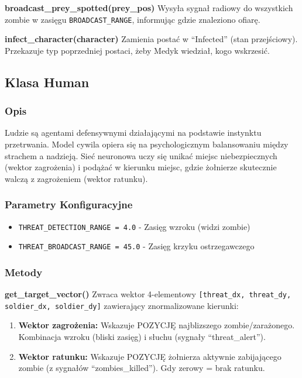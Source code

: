 \documentclass[12pt,a4paper]{article}
\begin{document}
\textbf{broadcast\_prey\_spotted(prey\_pos)}
Wysyła sygnał radiowy do wszystkich zombie w zasięgu \texttt{BROADCAST\_RANGE}, informując gdzie znaleziono ofiarę.

\textbf{infect\_character(character)}
Zamienia postać w ``Infected'' (stan przejściowy). Przekazuje typ poprzedniej postaci, żeby Medyk wiedział, kogo wskrzesić.

\subsection{Klasa Human}

\subsubsection{Opis}
Ludzie są agentami defensywnymi działającymi na podstawie instynktu
przetrwania. Model cywila opiera się na psychologicznym balansowaniu między
strachem a nadzieją. Sieć neuronowa uczy się unikać miejsc niebezpiecznych
(wektor zagrożenia) i podążać w kierunku miejsc, gdzie żołnierze skutecznie
walczą z zagrożeniem (wektor ratunku).

\subsubsection{Parametry Konfiguracyjne}
\begin{itemize}
	\item \texttt{THREAT\_DETECTION\_RANGE = 4.0} - Zasięg wzroku (widzi zombie)
	\item \texttt{THREAT\_BROADCAST\_RANGE = 45.0} - Zasięg krzyku ostrzegawczego
\end{itemize}

\subsubsection{Metody}

\textbf{get\_target\_vector()}
Zwraca wektor 4-elementowy \texttt{[threat\_dx, threat\_dy, soldier\_dx, soldier\_dy]} zawierający znormalizowane kierunki:

\begin{enumerate}
	\item \textbf{Wektor zagrożenia:} Wskazuje POZYCJĘ najblizszego zombie/zarażonego. Kombinacja wzroku (bliski zasięg) i słuchu (sygnały ``threat\_alert'').
	\item \textbf{Wektor ratunku:} Wskazuje POZYCJĘ żołnierza aktywnie zabijającego zombie (z sygnałów ``zombies\_killed''). Gdy zerowy = brak ratunku.
\end{enumerate}
\end{document}

